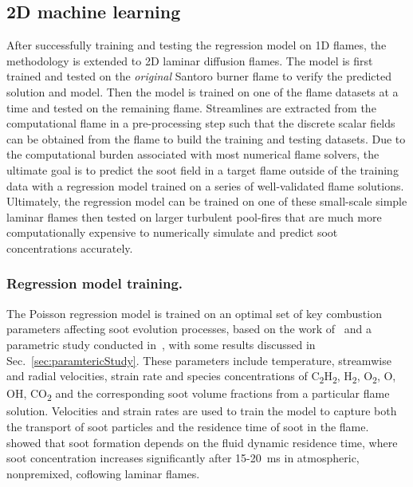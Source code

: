 \documentclass[12pt]{CHT-20}
\begin{document}
\subsection{2D machine learning}
After successfully training and testing the regression model on 1D flames, the methodology is extended to 2D laminar diffusion flames. The model is first trained and tested on the \emph{original} Santoro burner flame to verify the predicted solution and model. Then the model is trained on one of the flame datasets at a time and tested on the remaining flame. Streamlines are extracted from the computational flame in a pre-processing step such that the discrete scalar fields can be obtained from the flame to build the training and testing datasets. Due to the computational burden associated with most numerical flame solvers, the ultimate goal is to predict the soot field in a target flame outside of the training data with a regression model trained on a series of well-validated flame solutions. Ultimately, the regression model can be trained on one of these small-scale simple laminar flames then tested on larger turbulent pool-fires that are much more computationally expensive to numerically simulate and predict soot concentrations accurately.

\subsubsection{Regression model training.}
The Poisson regression model is trained on an optimal set of key combustion parameters affecting soot evolution processes, based on the work of~\citet{Zimmer2019} and a parametric study conducted in~\citep[]{Squeo2021}, with some results discussed in Sec.~\ref{sec:paramtericStudy}. These parameters include temperature, streamwise and radial velocities, strain rate and species concentrations of C\textsubscript{2}H\textsubscript{2}, H\textsubscript{2}, O\textsubscript{2}, O, OH, CO\textsubscript{2} and the corresponding soot volume fractions from a particular flame solution. Velocities and strain rates are used to train the model to capture both the transport of soot particles and the residence time of soot in the flame.~\citet{Smooke2005} showed that soot formation depends on the fluid dynamic residence time, where soot concentration increases significantly after 15-20~ms in atmospheric, nonpremixed, coflowing laminar flames.
\end{document}
